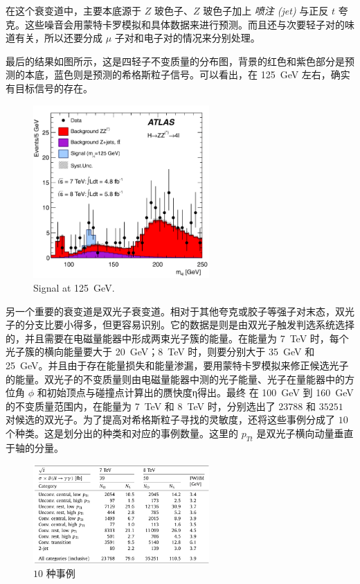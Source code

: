 \documentclass[oneside,a4paper,openany,11pt]{ctexbook}
\begin{document}
在这个衰变道中，主要本底源于 $Z$ 玻色子、$Z$ 玻色子加上 \emph{喷注 (jet)} 与正反 $t$ 夸克。这些噪音会用蒙特卡罗模拟和具体数据来进行预测。而且还与次要轻子对的味道有关，所以还要分成 $\mu$ 子对和电子对的情况来分别处理。

最后的结果如图所示，这是四轻子不变质量的分布图，背景的红色和紫色部分是预测的本底，蓝色则是预测的希格斯粒子信号。可以看出，在 \qty{125}{GeV} 左右，确实有目标信号的存在。

\begin{figure}[htbp]
    \centering
    \includegraphics[width=0.6\textwidth]{pic/events.png}
    \caption{Signal at \qty{125}{GeV}.}
    \label{fig:events}
\end{figure}

另一个重要的衰变道是双光子衰变道。相对于其他夸克或胶子等强子对末态，双光子的分支比要小得多，但更容易识别。它的数据是则是由双光子触发判选系统选择的，并且需要在电磁量能器中形成两束光子簇的能量。在能量为 \qty{7}{TeV} 时，每个光子簇的横向能量要大于 \qty{20}{GeV}；\qty{8}{TeV} 时，则要分别大于 \qty{35}{GeV} 和 \qty{25}{GeV}。并且由于存在能量损失和能量渗漏，要用蒙特卡罗模拟来修正候选光子的能量。双光子的不变质量则由电磁量能器中测的光子能量、光子在量能器中的方位角 $\phi$ 和初始顶点与碰撞点计算出的赝快度η得出。最终 在 \qty{100}{GeV} 到 \qty{160}{GeV} 的不变质量范围内，在能量为 \qty{7}{TeV} 和 \qty{8}{TeV} 时，分别选出了 $23788$ 和 $35251$ 对候选的双光子。为了提高对希格斯粒子寻找的灵敏度，还将这些事例分成了 $10$ 个种类。这是划分出的种类和对应的事例数量。这里的 $p_{Tt}$ 是双光子横向动量垂直于轴的分量。

\begin{figure}[htbp]
    \centering
    \includegraphics[width=0.6\textwidth]{pic/10.png}
    \caption{$10$ 种事例}
    \label{fig:10}
\end{figure}
\end{document}
